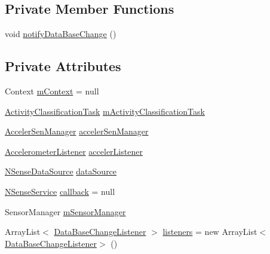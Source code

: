 \subsection*{Private Member Functions}
\begin{DoxyCompactItemize}
\item 
void \hyperlink{classcs_1_1nsense_1_1accelerometer_1_1_accelerometer_pipeline_aaeae9ffa3747ed0fa290c922047a4039}{notify\-Data\-Base\-Change} ()
\end{DoxyCompactItemize}
\subsection*{Private Attributes}
\begin{DoxyCompactItemize}
\item 
Context \hyperlink{classcs_1_1nsense_1_1accelerometer_1_1_accelerometer_pipeline_ab0dc7e6a6e83519769a749dcc8bcd830}{m\-Context} = null
\item 
\hyperlink{classcs_1_1nsense_1_1accelerometer_1_1_accelerometer_pipeline_1_1_activity_classification_task}{Activity\-Classification\-Task} \hyperlink{classcs_1_1nsense_1_1accelerometer_1_1_accelerometer_pipeline_a43938dfe068d23472196145f87f16d74}{m\-Activity\-Classification\-Task}
\item 
\hyperlink{classcs_1_1nsense_1_1accelerometer_1_1_acceler_sen_manager}{Acceler\-Sen\-Manager} \hyperlink{classcs_1_1nsense_1_1accelerometer_1_1_accelerometer_pipeline_a597c1f7ef2bb79f825adf13816c6f186}{acceler\-Sen\-Manager}
\item 
\hyperlink{interfacecs_1_1nsense_1_1accelerometer_1_1_accelerometer_listener}{Accelerometer\-Listener} \hyperlink{classcs_1_1nsense_1_1accelerometer_1_1_accelerometer_pipeline_a0f8f8f9c0d20d2eec6b53d071b24daa0}{acceler\-Listener}
\item 
\hyperlink{classcs_1_1nsense_1_1db_1_1_n_sense_data_source}{N\-Sense\-Data\-Source} \hyperlink{classcs_1_1nsense_1_1accelerometer_1_1_accelerometer_pipeline_a3d136e7961ce5ead1331d809aa30d41e}{data\-Source}
\item 
\hyperlink{classcs_1_1nsense_1_1_n_sense_service}{N\-Sense\-Service} \hyperlink{classcs_1_1nsense_1_1accelerometer_1_1_accelerometer_pipeline_a73c0b64e76b97c8e5246c7a0fae0b088}{callback} = null
\item 
Sensor\-Manager \hyperlink{classcs_1_1nsense_1_1accelerometer_1_1_accelerometer_pipeline_af7db7c994e5fecda89185176f2266940}{m\-Sensor\-Manager}
\item 
Array\-List$<$ \hyperlink{interfacecs_1_1nsense_1_1db_1_1_data_base_change_listener}{Data\-Base\-Change\-Listener} $>$ \hyperlink{classcs_1_1nsense_1_1accelerometer_1_1_accelerometer_pipeline_a5fb857adaf4060ad3cd3a45d4f78e23e}{listeners} = new Array\-List$<$\hyperlink{interfacecs_1_1nsense_1_1db_1_1_data_base_change_listener}{Data\-Base\-Change\-Listener}$>$ ()

\end{DoxyCompactItemize}
